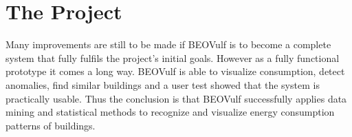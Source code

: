 \section{The Project}
Many improvements are still to be made if BEOVulf is to become a complete system that fully fulfils the project’s initial goals. However as a fully functional prototype it comes a long way. BEOVulf is able to visualize consumption, detect anomalies, find similar buildings and a user test showed that the system is practically usable. Thus the conclusion is that BEOVulf successfully applies data mining and statistical methods to recognize and visualize energy consumption patterns of buildings.